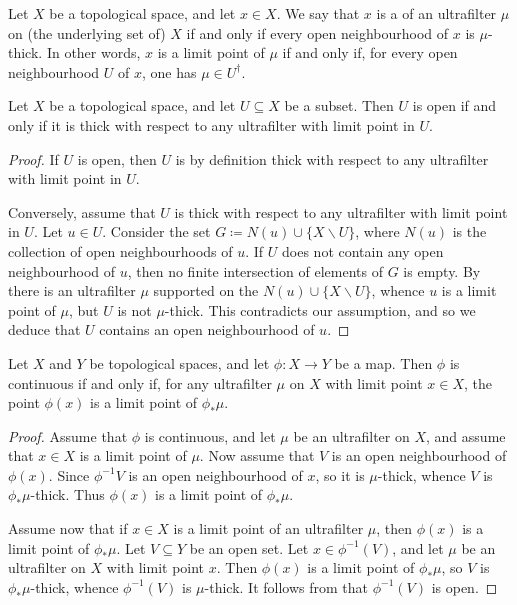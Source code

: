 \begin{definition} \label{limitpointofultrafilter}
	Let $ X $ be a topological space, and let $ x \in X $.
	We say that $ x $ is a  of an ultrafilter $ \mu $ on (the underlying set of) $ X $ if and only if every open neighbourhood of $ x $ is $ \mu $-thick.
	In other words, $ x $ is a limit point of $ \mu $ if and only if, for every open neighbourhood $ U $ of $ x $, one has $ \mu \in U^{\dag} $.
\end{definition}

\begin{lemma} \label{opensetsarethickwrtultrafilters}
	Let $ X $ be a topological space, and let $ U \subseteq X$ be a subset.
	Then $ U $ is open if and only if it is thick with respect to any ultrafilter with limit point in $ U $.
\end{lemma}

\begin{proof}
	If $ U $ is open, then $ U $ is by definition thick with respect to any ultrafilter with limit point in $ U $.

	Conversely, assume that $ U $ is thick with respect to any ultrafilter with limit point in $ U $.
	Let $ u \in U $.
	Consider the set $ G \coloneq N(u) \cup \{ X \smallsetminus U \} $, where $N(u)$ is the collection of open neighbourhoods of $u$.
	If $ U $ does not contain any open neighbourhood of $u$, then no finite intersection of elements of $ G $ is empty.
	By  there is an ultrafilter $ \mu $ supported on the $ N(u) \cup \{ X \smallsetminus U \} $, whence $ u $ is a limit point of $ \mu $, but $ U $ is not $ \mu $-thick.
	This contradicts our assumption, and so we deduce that $ U $ contains an open neighbourhood of $ u $.
\end{proof}

\begin{lemma} \label{continuityviaultrafilters}
	Let $ X $ and $ Y $ be topological spaces, and let $ \phi \colon X \to Y $ be a map.
	Then $ \phi $ is continuous if and only if, for any ultrafilter $ \mu $ on $ X $ with limit point $ x \in X $, the point $ \phi(x) $ is a limit point of $ \phi_{\ast}\mu $.
\end{lemma}

\begin{proof}
	Assume that $ \phi $ is continuous, and let $ \mu $ be an ultrafilter on $ X $, and assume that $ x \in X $ is a limit point of  $ \mu $.
	Now assume that $ V $ is an open neighbourhood of $ \phi(x) $.
	Since $ \phi^{-1}V $ is an open neighbourhood of $ x $, so it is $ \mu $-thick, whence $ V $ is $\phi_{\ast}\mu$-thick.
	Thus $ \phi(x) $ is a limit point of $ \phi_{\ast}\mu $.

	Assume now that if $ x \in X $ is a limit point of an ultrafilter $ \mu $, then $ \phi(x) $ is a limit point of $ \phi_{\ast}\mu $.
	Let $ V \subseteq Y $ be an open set.
	Let $ x \in \phi^{-1}(V) $, and let $ \mu $ be an ultrafilter on $ X $ with limit point $ x $.
	Then $ \phi(x) $ is a limit point of $ \phi_{\ast}\mu $, so $V$ is $ \phi_{\ast}\mu $-thick, whence $ \phi^{-1}(V) $ is $ \mu $-thick.
	It follows from  that $\phi^{-1}(V)$ is open.
\end{proof}

